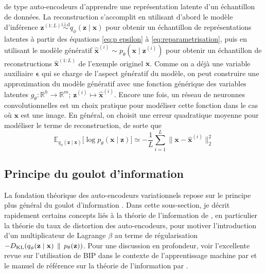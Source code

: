 de type auto-encodeurs d'apprendre une représentation latente d'un échantillon de données.
La reconstruction s'accomplit en utilisant d'abord le modèle d'inférence 
$\mathbf{z}^{(1:L)} \overset{\mathrm{i.i.d}}{\sim} q_\phi(\mathbf{z} \mid \mathbf{x})$ 
pour obtenir un échantillon de représentations latentes à partir des équations \eqref{eq:p epsilon} à \eqref{eq:reparametrisation}, 
puis en utilisant le modèle génératif $\hat{\mathbf{x}}^{(i)} \sim p_\theta(\mathbf{x} \mid \mathbf{z}^{(i)})$ pour obtenir 
un échantillon de reconstructions $\mathbf{\hat{x}}^{(1:L)}$ de l'exemple originel $\mathbf{\mathbf{x}}$. 
Comme on a déjà une variable auxiliaire $\boldsymbol{ \epsilon} $ 
qui se charge de l'aspect génératif du modèle, on peut construire une approximation du 
modèle génératif avec une fonction générique des variables latentes 
${g_\theta: \mathbb{R}^{h} \rightarrow \mathbb{R}^{m};\, \mathbf{z}^{(i)} \mapsto \hat{\mathbf{x}}^{(i)}}$.
Encore une fois, un réseau de neuronnes convolutionnelles est un choix pratique pour modéliser cette fonction 
dans le cas où $\mathbf{x}$ est une image. En général, on choisit une erreur quadratique moyenne pour modéliser le terme de reconstruction, 
de sorte que
\begin{equation}\label{eq:reconstruction}
        \mathbb{E}_{q_\phi(\mathbf{z} \mid \mathbf{x})} \bigg[
                \log p_\theta(\mathbf{x} \mid \mathbf{z})
        \bigg] 
        \simeq -\frac{1}{L}\sum_{i=1}^{L} \lVert \mathbf{x} - \hat{\mathbf{x}}^{(i)} \rVert_2^{2}
\end{equation} 

\subsection{Principe du goulot d'information}

La fondation théorique des auto-encodeurs variationnels repose sur le principe plus général 
du goulot d'information \citep[BIP, de l'anglais \textit{bottleneck information principle:}][]{Tishby1999}. 
Dans cette sous-section, je décrit rapidement certains concepts 
liés à la théorie de l'information de \citet{Shannon1948}, en particulier la théorie du taux de distortion des auto-encodeurs,
pour motiver l'introduction d'un multiplicateur de 
Lagrange $\beta$ au terme de régularisation ${-D_{\mathrm{KL}}(q_\phi(\mathbf{z} \mid \mathbf{x})\, \mathrel{\Vert}\, p_\theta(\mathbf{z}))}$.
Pour une discussion en profondeur, voir l'excellente revue sur l'utilisation de BIP dans le contexte de l'apprentissage 
machine par \citet{Goldfield2020} et le manuel de référence sur la théorie de l'information par \citet{Cover2006}.

